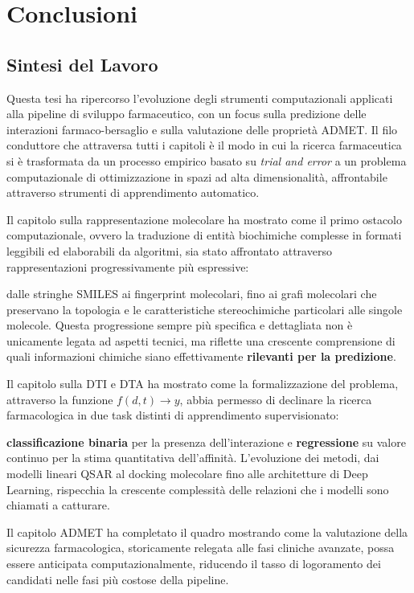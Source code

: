\chapter{Conclusioni}

\section{Sintesi del Lavoro}

Questa tesi ha ripercorso l'evoluzione degli strumenti 
computazionali applicati alla pipeline di sviluppo farmaceutico, 
con un focus sulla predizione delle interazioni farmaco-bersaglio 
e sulla valutazione delle proprietà ADMET. 
Il filo conduttore 
che attraversa tutti i capitoli è il modo in cui la ricerca farmaceutica si è trasformata da un 
processo empirico basato su \textit{trial and error} a un 
problema computazionale di ottimizzazione in spazi ad alta dimensionalità, 
affrontabile attraverso strumenti di apprendimento 
automatico.

Il capitolo sulla rappresentazione molecolare ha mostrato come 
il primo ostacolo computazionale, ovvero la traduzione di entità biochimiche 
complesse in formati leggibili ed elaborabili da algoritmi, sia stato 
affrontato attraverso rappresentazioni progressivamente più 
espressive: 

dalle stringhe SMILES ai fingerprint molecolari, 
fino ai grafi molecolari che preservano la topologia e le caratteristiche
stereochimiche particolari alle singole molecole. Questa progressione sempre più specifica e dettagliata non è unicamente legata ad aspetti tecnici, ma riflette una crescente comprensione di quali informazioni 
chimiche siano effettivamente \textbf{rilevanti per la predizione}.

Il capitolo sulla DTI e DTA ha mostrato come la formalizzazione 
del problema, attraverso la funzione $f(d,t) \rightarrow y$, abbia 
permesso di declinare la ricerca farmacologica in due task 
distinti di apprendimento supervisionato: 

\textbf{classificazione binaria} per la presenza dell'interazione e \textbf{regressione} su valore continuo per 
la stima quantitativa dell'affinità. L'evoluzione dei metodi, 
dai modelli lineari QSAR al docking molecolare fino alle 
architetture di Deep Learning, rispecchia la crescente 
complessità delle relazioni che i modelli sono chiamati a 
catturare.

Il capitolo ADMET ha completato il quadro mostrando come la 
valutazione della sicurezza farmacologica, storicamente 
relegata alle fasi cliniche avanzate, possa essere anticipata 
computazionalmente, riducendo il tasso di logoramento dei 
candidati nelle fasi più costose della pipeline.

